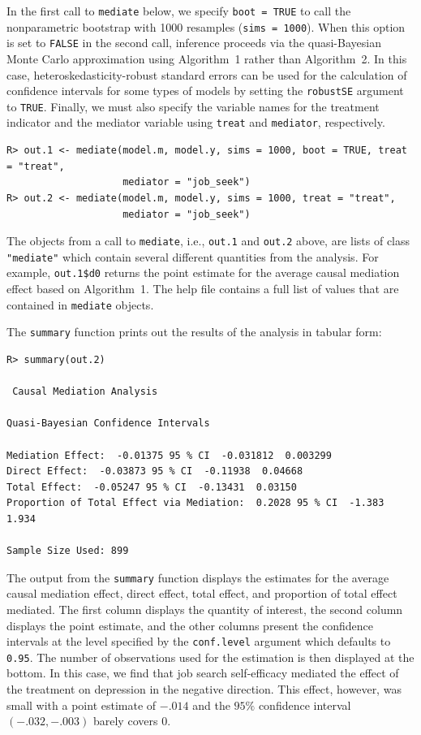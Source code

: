 \documentclass[11pt,letterpaper]{article}
\theoremstyle{plain}
\begin{document}
In the first call to \texttt{mediate} below, we specify \texttt{boot
  = TRUE} to call the nonparametric bootstrap with 1000 resamples
({\tt sims = 1000}). When this option is set to {\tt FALSE} in the second
call, inference proceeds via the quasi-Bayesian Monte Carlo
approximation using Algorithm~1 rather than Algorithm~2.  In this case,
heteroskedasticity-robust standard errors can be used for the calculation of
confidence intervals for some types of models by setting the {\tt robustSE}
argument to {\tt TRUE}.  Finally, we must also
specify the variable names for the treatment indicator and the
mediator variable using {\tt treat} and {\tt mediator}, respectively.
\begin{verbatim}
R> out.1 <- mediate(model.m, model.y, sims = 1000, boot = TRUE, treat = "treat",
                    mediator = "job_seek")
R> out.2 <- mediate(model.m, model.y, sims = 1000, treat = "treat",
                    mediator = "job_seek")
\end{verbatim}
The objects from a call to \texttt{mediate}, i.e., {\tt out.1} and
{\tt out.2} above, are lists of class {\tt "mediate"} which contain several different
quantities from the analysis.  For example, \texttt{out.1\$d0} returns
the point estimate for the average causal mediation effect based on
Algorithm~1.  The help file contains a full list of values that are
contained in \texttt{mediate} objects.

The \texttt{summary}
function prints out the results of the analysis in tabular form:
\begin{verbatim}
R> summary(out.2)

 Causal Mediation Analysis 

Quasi-Bayesian Confidence Intervals

Mediation Effect:  -0.01375 95 % CI  -0.031812  0.003299 
Direct Effect:  -0.03873 95 % CI  -0.11938  0.04668 
Total Effect:  -0.05247 95 % CI  -0.13431  0.03150 
Proportion of Total Effect via Mediation:  0.2028 95 % CI  -1.383  1.934 

Sample Size Used: 899 
\end{verbatim}
The output from the {\tt summary} function displays the estimates
for the average causal mediation effect, direct effect, total effect,
and proportion of total effect mediated. The first column displays the
quantity of interest, the second column displays the point estimate,
and the other columns present the confidence intervals at the level
specified by the {\tt conf.level} argument which defaults to {\tt 0.95}.
The number of observations used for the estimation is then displayed at
the bottom.  In this case, we
find that job search self-efficacy mediated the effect of the
treatment on depression in the negative direction. This effect,
however, was small with a point estimate of $-.014$ and the $95\%$
confidence interval $(-.032,-.003)$ barely covers $0$.
\end{document}
